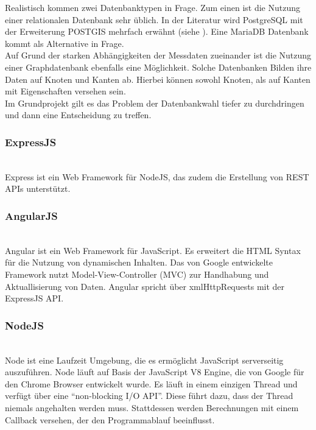 \documentclass[10pt,conference,compsocconf]{IEEEtran}
\begin{document}
Realistisch kommen zwei Datenbanktypen in Frage. Zum einen ist die Nutzung einer relationalen Datenbank sehr üblich. In der Literatur wird PostgreSQL mit der Erweiterung POSTGIS mehrfach erwähnt (siehe \cite{wms_flow_mapping} \cite{waldbiomasse}). Eine MariaDB Datenbank kommt als Alternative in Frage.\\
Auf Grund der starken Abhängigkeiten der Messdaten zueinander ist die Nutzung einer Graphdatenbank ebenfalls eine Möglichkeit. Solche Datenbanken Bilden ihre Daten auf Knoten und Kanten ab. Hierbei können sowohl Knoten, als auf Kanten mit Eigenschaften versehen sein.\\
Im Grundprojekt gilt es das Problem der Datenbankwahl tiefer zu durchdringen und dann eine Entscheidung zu treffen.\vspace{.5em}

\subsubsection{ExpressJS}\hspace*{\fill} \\
Express ist ein Web Framework für NodeJS, das zudem die Erstellung von REST APIs unterstützt.\vspace{.5em}

\subsubsection{AngularJS}\hspace*{\fill} \\
Angular ist ein Web Framework für JavaScript. Es erweitert die HTML Syntax für die Nutzung von dynamischen Inhalten. Das von Google entwickelte Framework nutzt Model-View-Controller (MVC) zur Handhabung und Aktuallisierung von Daten. Angular spricht über xmlHttpRequests mit der ExpressJS API.\vspace{.5em}

\subsubsection{NodeJS}\hspace*{\fill} \\
Node ist eine Laufzeit Umgebung, die es ermöglicht JavaScript serverseitig auszuführen. Node läuft auf Basis der JavaScript V8 Engine, die von Google für den Chrome Browser entwickelt wurde. Es läuft in einem einzigen Thread und verfügt über eine \enquote{non-blocking I/O API}. Diese führt dazu, dass der Thread niemals angehalten werden muss. Stattdessen werden Berechnungen mit einem Callback versehen, der den Programmablauf beeinflusst.
\end{document}
